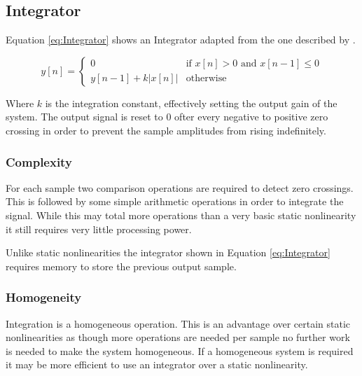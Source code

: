 

	\subsection{Integrator}
	\label{sec:Excitation-Integrator}
		Equation \ref{eq:Integrator} shows an Integrator adapted from the one described by \citet{larsen2004audio}.

		\begin{equation}
			y[n] = \begin{cases}
				0 & \text{if $x[n] > 0$ and $x[n - 1] \leq 0$} \\
				y[n - 1] + k|x[n]| & \text{otherwise}
			\end{cases}
			\label{eq:Integrator}
		\end{equation}

		Where $k$ is the integration constant, effectively setting the output gain of the system. The output signal
		is reset to 0 ofter every negative to positive zero crossing in order to prevent the sample amplitudes from
		rising indefinitely.

		\subsubsection*{Complexity}
			For each sample two comparison operations are required to detect zero crossings. This is followed
			by some simple arithmetic operations in order to integrate the signal. While this may total more
			operations than a very basic static nonlinearity it still requires very little processing power.

			Unlike static nonlinearities the integrator shown in Equation \ref{eq:Integrator} requires memory
			to store the previous output sample. 

		\subsubsection*{Homogeneity}
			Integration is a homogeneous operation. This is an advantage over certain static nonlinearities as
			though more operations are needed per sample no further work is needed to make the system
			homogeneous. If a homogeneous system is required it may be more efficient to use an integrator over
			a static nonlinearity.
		
